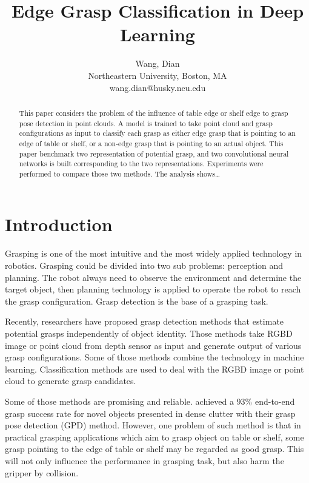 \documentclass[letterpaper]{article} %
\begin{document}
%

\title{Edge Grasp Classification in Deep Learning}
\author{Wang, Dian\\
Northeastern University, Boston, MA\\
{wang.dian@husky.neu.edu}
}
\maketitle
\begin{abstract}
This paper considers the problem of the influence of table edge or shelf edge to grasp pose detection in point clouds. A model is trained to take point cloud and grasp configurations as input to classify each grasp as either edge grasp that is pointing to an edge of table or shelf, or a non-edge grasp that is pointing to an actual object. This paper benchmark two representation of potential grasp, and two convolutional neural networks is built corresponding to the two representations. Experiments were performed to compare those two methods. The analysis shows…
\end{abstract}

\section{Introduction}
\noindent Grasping is one of the most intuitive and the most widely applied technology in robotics. Grasping could be divided into two sub problems: perception and planning. The robot always need to observe the environment and determine the target object, then planning technology is applied to operate the robot to reach the grasp configuration. Grasp detection is the base of a grasping task.

Recently, researchers have proposed grasp detection methods that estimate potential grasps independently of object identity. Those methods take RGBD image or point cloud from depth sensor as input and generate output of various grasp configurations. Some of those methods combine the technology in machine learning. Classification methods are used to deal with the RGBD image or point cloud to generate grasp candidates.

Some of those methods are promising and reliable. \cite{RN6} achieved a 93\% end-to-end grasp success rate for novel objects presented in dense clutter with their grasp pose detection (GPD) method. However, one problem of such method is that in practical grasping applications which aim to grasp object on table or shelf, some grasp pointing to the edge of table or shelf may be regarded as good grasp. This will not only influence the performance in grasping task, but also harm the gripper by collision. 
\end{document}
